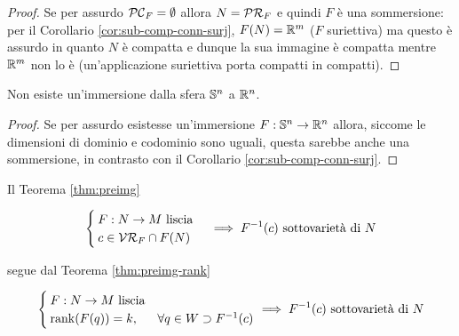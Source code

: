 \begin{proof}
	Se per assurdo $ \PC_{F} = \emptyset $ allora $ N = \PR_{F} $ e quindi $ F $ è una sommersione: per il Corollario \ref{cor:sub-comp-conn-surj}, $ F(N) = \R^{m} $ ($ F $ suriettiva) ma questo è assurdo in quanto $ N $ è compatta e dunque la sua immagine è compatta mentre $ \R^{m} $ non lo è (un'applicazione suriettiva porta compatti in compatti).
\end{proof}

\begin{corollary}\label{cor:imm-sph}
	Non esiste un'immersione dalla sfera $ \S^{n} $ a $ \R^{n} $.
\end{corollary}

\begin{proof}
	Se per assurdo esistesse un'immersione $ F : \S^{n} \to \R^{n} $ allora, siccome le dimensioni di dominio e codominio sono uguali, questa sarebbe anche una sommersione, in contrasto con il Corollario \ref{cor:sub-comp-conn-surj}.
\end{proof}

\begin{remark}
	Il Teorema \ref{thm:preimg}

	\begin{equation}
		\begin{cases}
			F : N \to M \text{ liscia} \\
			c \in \VR_{F} \cap F(N)
		\end{cases} %
		\implies %
		F^{-1}(c) \text{ sottovarietà di } N
	\end{equation}

	segue dal Teorema \ref{thm:preimg-rank}
	
	\begin{equation}
		\begin{cases}
			F : N \to M \text{ liscia} \\
			\rank(F(q)) = k, & \forall q \in W \supset F^{-1}(c)
		\end{cases} %
		\implies %
		F^{-1}(c) \text{ sottovarietà di } N
	\end{equation}
\end{remark}

